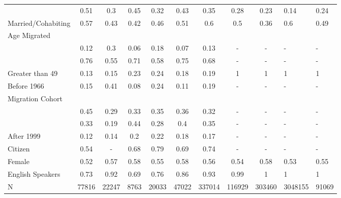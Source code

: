 \begin{table}[ht]
\begin{tabular}{>{\raggedright\arraybackslash}p{3.2cm}|cccccccc}
  & 0.51 & 0.3 & 0.45 & 0.32 & 0.43 & 0.35 & 0.28 & 0.23 & 0.14 & 0.24 \\ 
  Married/Cohabiting & 0.57 & 0.43 & 0.42 & 0.46 & 0.51 & 0.6 & 0.5 & 0.36 & 0.6 & 0.49 \\ 
  Age Migrated &  &  &  &  &  &  &  &  &  &  \\ 
  & 0.12 & 0.3 & 0.06 & 0.18 & 0.07 & 0.13 & - & - & - & - \\ 
  & 0.76 & 0.55 & 0.71 & 0.58 & 0.75 & 0.68 & - & - & - & - \\ 
  Greater than 49 & 0.13 & 0.15 & 0.23 & 0.24 & 0.18 & 0.19 & 1 & 1 & 1 & 1 \\ 
  Before 1966 & 0.15 & 0.41 & 0.08 & 0.24 & 0.11 & 0.19 & - & - & - & - \\ 
  Migration Cohort &  &  &  &  &  &  &  &  &  &  \\ 
  & 0.45 & 0.29 & 0.33 & 0.35 & 0.36 & 0.32 & - & - & - & - \\ 
  & 0.33 & 0.19 & 0.44 & 0.28 & 0.4 & 0.35 & - & - & - & - \\ 
  After 1999 & 0.12 & 0.14 & 0.2 & 0.22 & 0.18 & 0.17 & - & - & - & - \\ 
  Citizen & 0.54 & - & 0.68 & 0.79 & 0.69 & 0.74 & - & - & - & - \\ 
  Female & 0.52 & 0.57 & 0.58 & 0.55 & 0.58 & 0.56 & 0.54 & 0.58 & 0.53 & 0.55 \\ 
  English Speakers & 0.73 & 0.92 & 0.69 & 0.76 & 0.86 & 0.93 & 0.99 & 1 & 1 & 1 \\ 
  N & 77816 & 22247 & 8763 & 20033 & 47022 & 337014 & 116929 & 303460 & 3048155 & 91069 \\ 
   \hline
\end{tabular}
\endgroup
\end{table}
